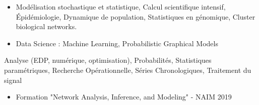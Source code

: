 \medskip

\begin{itemize}
\item 
    Modélisation stochastique et statistique, 
    Calcul scientifique intensif,
    \'Epidémiologie, 
    Dynamique de population,
    Statistiques en génomique, Cluster biological networks.
\item Data Science : Machine Learning, Probabilistic Graphical Models
\end{itemize}
\medskip

    Analyse (EDP, numérique, optimisation), Probabilités, Statistiques paramétriques, Recherche Opérationnelle, Séries Chronologiques, Traitement du signal
\medskip

\medskip


\divider

\begin{itemize}
\item Formation "Network Analysis, Inference, and Modeling" - NAIM 2019
\end{itemize}




% 
% 
%   

